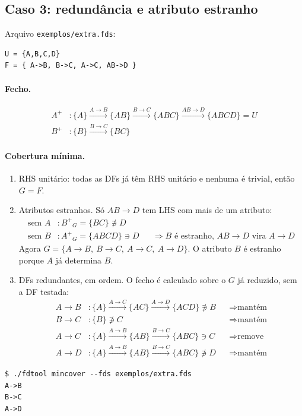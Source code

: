 \documentclass[11pt,a4paper]{article}
\newcommand{\fd}[2]{\ensuremath{#1 \to #2}}
\newcommand{\cl}[1]{\ensuremath{#1^{+}}}
\newcommand{\via}[1]{\xrightarrow{#1}}
\begin{document}
\subsection{Caso 3: redundância e atributo estranho}
\label{sec:caso3}

Arquivo \texttt{exemplos/extra.fds}:
\begin{verbatim}
U = {A,B,C,D}
F = { A->B, B->C, A->C, AB->D }
\end{verbatim}

\paragraph{Fecho.}
\begin{align*}
    \cl{A} &: \{A\} \via{\fd{A}{B}} \{AB\} \via{\fd{B}{C}} \{ABC\}
    \via{\fd{AB}{D}} \{ABCD\} = U \\
    \cl{B} &: \{B\} \via{\fd{B}{C}} \{BC\}
\end{align*}

\paragraph{Cobertura mínima.}
\begin{enumerate}
    \item RHS unitário: todas as DFs já têm RHS unitário e nenhuma é trivial,
        então $G = F$.

    \item Atributos estranhos. Só \fd{AB}{D} tem LHS com mais de um atributo:
        \begin{align*}
            \text{sem } A &: \cl{B}_{G} = \{BC\} \not\ni D \\
            \text{sem } B &: \cl{A}_{G} = \{ABCD\} \ni D
            &&\Rightarrow B \text{ é estranho, } \fd{AB}{D} \text{ vira } \fd{A}{D}
        \end{align*}
        Agora $G = \{\fd{A}{B},\ \fd{B}{C},\ \fd{A}{C},\ \fd{A}{D}\}$. O
        atributo $B$ é estranho porque $A$ já determina $B$.

    \item DFs redundantes, em ordem. O fecho é calculado sobre o $G$ já
        reduzido, sem a DF testada:
        \begin{align*}
            \fd{A}{B} &: \{A\} \via{\fd{A}{C}} \{AC\} \via{\fd{A}{D}} \{ACD\} \not\ni B
            &&\Rightarrow \text{mantém} \\
            \fd{B}{C} &: \{B\} \not\ni C
            &&\Rightarrow \text{mantém} \\
            \fd{A}{C} &: \{A\} \via{\fd{A}{B}} \{AB\} \via{\fd{B}{C}} \{ABC\} \ni C
            &&\Rightarrow \text{remove} \\
            \fd{A}{D} &: \{A\} \via{\fd{A}{B}} \{AB\} \via{\fd{B}{C}} \{ABC\} \not\ni D
            &&\Rightarrow \text{mantém}
        \end{align*}
\end{enumerate}
\begin{verbatim}
$ ./fdtool mincover --fds exemplos/extra.fds
A->B
B->C
A->D
\end{verbatim}
\end{document}
